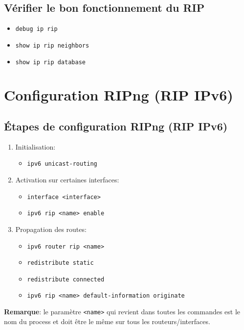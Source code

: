 \documentclass[a4paper]{article}
\begin{document}
\subsection{Vérifier le bon fonctionnement du RIP}



\begin{itemize}[label=\textbf{–}]
    \item \texttt{debug ip rip}
    \item \texttt{show ip rip neighbors}
    \item \texttt{show ip rip database}
\end{itemize}










\section{Configuration RIPng (RIP IPv6)}





\subsection{Étapes de configuration RIPng (RIP IPv6)}



\begin{enumerate}
    \item Initialisation:
    \begin{itemize}[label=\textbf{–}]
        \item \texttt{ipv6 unicast-routing}
    \end{itemize}
    \item Activation sur certaines interfaces:
    \begin{itemize}[label=\textbf{–}]
        \item \texttt{interface <interface>}
        \item \texttt{ipv6 rip <name> enable}
    \end{itemize}
    \item Propagation des routes:
    \begin{itemize}[label=\textbf{–}]
        \item \texttt{ipv6 router rip <name>}
        \item \texttt{redistribute static}
        \item \texttt{redistribute connected}
        \item \texttt{ipv6 rip <name> default-information originate}
    \end{itemize}
\end{enumerate}
\textbf{Remarque}: le paramètre \texttt{<name>} qui revient dans toutes les commandes est le nom du process et doit être le même sur tous les routeurs/interfaces.
\end{document}
